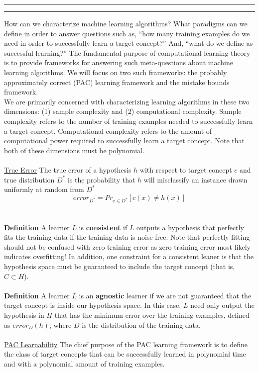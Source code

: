 \documentclass[11pt]{article}
\newcounter{questionCounter}
\newcounter{partCounter}[questionCounter]
\newenvironment{question}[2][\arabic{questionCounter}]{%
    \addtocounter{questionCounter}{1}%
    \setcounter{partCounter}{0}%
    \vspace{.25in} \hrule \vspace{0.5em}%
        \noindent{\bf #1: #2}%
    \vspace{0.8em} \hrule \vspace{.10in}%
}{}
\begin{document}
\begin{question}{Computational Learning Theory:}
How can we characterize machine learning algorithms? What paradigms can we define in order to answer questions such as, ``how many training examples do we need in order to successfully learn a target concept?'' And, ``what do we define as successful learning?'' The fundamental purpose of computational learning theory is to provide frameworks for answering such meta-questions about machine learning algorithms. We will focus on two such frameworks: the probably approximately correct (PAC) learning framework and the mistake bounds framework.
\\
We are primarily concerned with characterizing learning algorithms in these two dimensions: (1) sample complexity and (2) computational complexity. Sample complexity refers to the number of training examples needed to successfully learn a target concept. Computational complexity refers to the amount of computational power required to successfully learn a target concept. Note that both of these dimensions must be polynomial.
\\
\\
\underline{True Error} The true error of a hypothesis $h$ with respect to target concept $c$ and true distribution $D^*$ is the probability that $h$ will misclassify an instance drawn uniformly at random from $D^*$ $$error_{D^*} = Pr_{x\in D^*}[c(x) \not = h(x)]$$
\\
\\
\textbf{Definition} A learner $L$ is \textbf{consistent} if $L$ outputs a hypothesis that perfectly fits the training data if the training data is noise-free. Note that perfectly fitting should not be confused with zero training error as zero training error most likely indicates overfitting! In addition, one constraint for a consistent leaner is that the hypothesis space must be guaranteed to include the target concept (that is, $C \subset H$).
\\
\\
\textbf{Definition} A learner $L$ is an \textbf{agnostic} learner if we are not guaranteed that the target concept is inside our hypothesis space. In this case, $L$ need only output the hypothesis in $H$ that has the minimum error over the training examples, defined as $error_D(h)$, where $D$ is the distribution of the training data.
\\
\\
\underline{PAC Learnability} The chief purpose of the PAC learning framework is to define the class of target concepts that can be successfully learned in polynomial time and with a polynomial amount of training examples.

\end{question}
\end{document}
